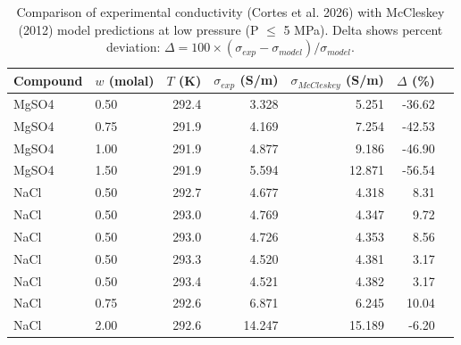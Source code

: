 \begin{table}[ht]
\centering
\begin{tabular}{llrrrrr}
\hline
Compound & $w$ (molal) & $T$ (K) & $\sigma_{exp}$ (\si{S/m}) & $\sigma_{McCleskey}$ (\si{S/m}) & $\Delta$ (\%) \\
\hline
MgSO4 & 0.50 & 292.4 & 3.328 & 5.251 & -36.62 \\
MgSO4 & 0.75 & 291.9 & 4.169 & 7.254 & -42.53 \\
MgSO4 & 1.00 & 291.9 & 4.877 & 9.186 & -46.90 \\
MgSO4 & 1.50 & 291.9 & 5.594 & 12.871 & -56.54 \\
NaCl & 0.50 & 292.7 & 4.677 & 4.318 & 8.31 \\
NaCl & 0.50 & 293.0 & 4.769 & 4.347 & 9.72 \\
NaCl & 0.50 & 293.0 & 4.726 & 4.353 & 8.56 \\
NaCl & 0.50 & 293.3 & 4.520 & 4.381 & 3.17 \\
NaCl & 0.50 & 293.4 & 4.521 & 4.382 & 3.17 \\
NaCl & 0.75 & 292.6 & 6.871 & 6.245 & 10.04 \\
NaCl & 2.00 & 292.6 & 14.247 & 15.189 & -6.20 \\
\hline
\end{tabular}
\caption{Comparison of experimental conductivity (Cortes et al. 2026) with McCleskey (2012) model predictions at low pressure (P $\leq$ 5 MPa). Delta shows percent deviation: $\Delta = 100 \times (\sigma_{exp} - \sigma_{model}) / \sigma_{model}$.}
\label{tab:McCleskeyComparison}
\end{table}
